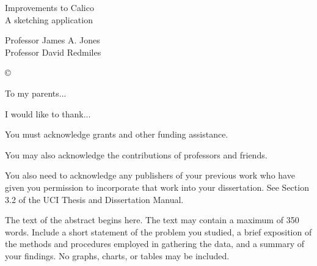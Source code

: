 \documentclass[12pt,fleqn]{ucithesis}
\begin{document}
\thesistitle
{
  Improvements to Calico\\
  A sketching application
}




\othercommitteemembers
{
  Professor James A. Jones\\
  Professor David Redmiles
}


\copyrightdeclaration
{
  {\copyright} {\Degreeyear} \Authorname
}


\dedications
{
  To my parents...
}

\acknowledgments
{
  I would like to thank...

  You must acknowledge grants and other funding assistance. 

  You may also acknowledge the contributions of professors and friends. 
  
  You also need to acknowledge any publishers of your previous work who have given you permission to incorporate that work into your dissertation. See Section 3.2 of the UCI Thesis and Dissertation Manual.
}


\thesisabstract
{
  The text of the abstract begins here. The text may contain a maximum of 350 words. Include a short statement of the problem you studied, a brief exposition of the methods and procedures employed in gathering the data, and a summary of your findings. No graphs, charts, or tables may be included.
}

\preliminarypages











\clearpage
{}




\end{document}
